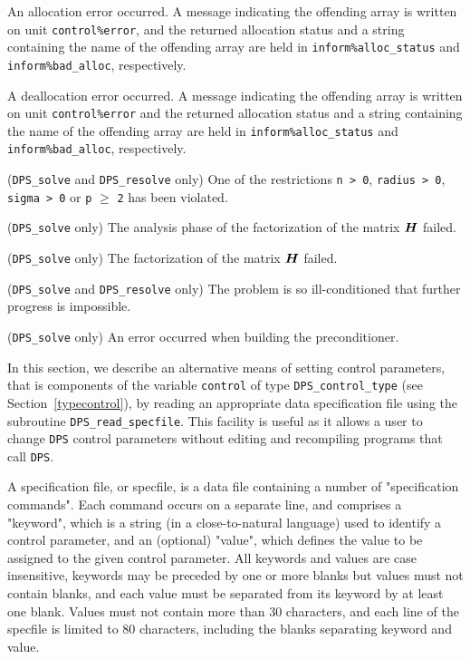 \documentclass{galahad}
\newcommand{\packagename}{DPS}
\begin{document}
\begin{description}
 An allocation error occurred. A message indicating
the offending
array is written on unit {\tt control\%error}, and the returned allocation
status and a string containing the name of the offending array
are held in {\tt inform\%alloc\_\-status}
and {\tt inform\%bad\_alloc}, respectively.

 A deallocation error occurred.
A message indicating the offending
array is written on unit {\tt control\%error} and the returned allocation
status and a string containing the name of the offending array
are held in {\tt inform\%alloc\_\-status}
and {\tt inform\%bad\_alloc}, respectively.

 ({\tt \packagename\_solve} and
{\tt \packagename\_resolve} only)
One of the restrictions
{\tt n > 0},
{\tt radius > 0},
{\tt sigma > 0}
or
{\tt p} $\geq$ {\tt 2}
has been violated.

 ({\tt \packagename\_solve} only)
The analysis phase of the factorization of the matrix ${\bm{H}}$ failed.

 ({\tt \packagename\_solve} only)
The factorization of the matrix ${\bm{H}}$ failed.

 ({\tt \packagename\_solve} and
{\tt \packagename\_resolve} only)
The problem is so ill-conditioned that further progress is impossible.

 ({\tt \packagename\_solve} only)
 An error occurred when building the preconditioner.

\end{description}


\galfeatures
\noindent In this section, we describe an alternative means of setting
control parameters, that is components of the variable {\tt control} of type
{\tt \packagename\_control\_type}
(see Section~\ref{typecontrol}),
by reading an appropriate data specification file using the
subroutine {\tt \packagename\_read\_specfile}. This facility
is useful as it allows a user to change  {\tt \packagename} control parameters
without editing and recompiling programs that call {\tt \packagename}.

A specification file, or specfile, is a data file containing a number of
"specification commands". Each command occurs on a separate line,
and comprises a "keyword",
which is a string (in a close-to-natural language) used to identify a
control parameter, and
an (optional) "value", which defines the value to be assigned to the given
control parameter. All keywords and values are case insensitive,
keywords may be preceded by one or more blanks but
values must not contain blanks, and
each value must be separated from its keyword by at least one blank.
Values must not contain more than 30 characters, and
each line of the specfile is limited to 80 characters,
including the blanks separating keyword and value.
\end{document}
